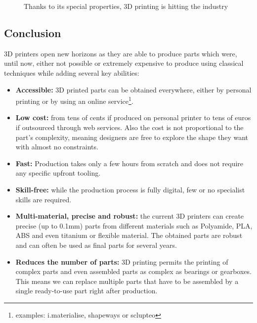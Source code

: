 \begin{figure}[tb]
\centering
    \hfil
    \caption{Thanks to its special properties, 3D printing is hitting the industry}
    \label{fig:industrie_printing}
\end{figure}



\subsection{Conclusion} %

3D printers open new horizons as they are able to produce parts which were, until now, either not possible or extremely expensive to produce using classical techniques while adding several key abilities:
\begin{itemize}
    \item \textbf{Accessible:} 3D printed parts can be obtained everywhere, either by personal printing or by using an online service\footnote{examples: i.materialise, shapeways or sclupteo}.
    \item \textbf{Low cost:}  from tens of cents if produced on personal printer to tens of euros if outsourced through web services. Also the cost is not proportional to the part’s complexity, meaning designers are free to explore the shape they want with almost no constraints.
    \item \textbf{Fast:} Production takes only a few hours from scratch and does not require any specific upfront tooling.
    \item \textbf{Skill-free:} while the production process is fully digital, few or no specialist skills are required.
    \item \textbf{Multi-material, precise and robust:} the current 3D printers can create precise (up to 0.1mm) parts from different materials such as Polyamide, PLA, ABS and even titanium or flexible material. The obtained parts are robust and can often be used as final parts for several years.
    \item \textbf{Reduces the number of parts:} 3D printing permits the printing of complex parts and even assembled parts as complex as bearings or gearboxes. This means we can replace multiple parts that have to be assembled by a single ready-to-use part right after production.
\end{itemize}


